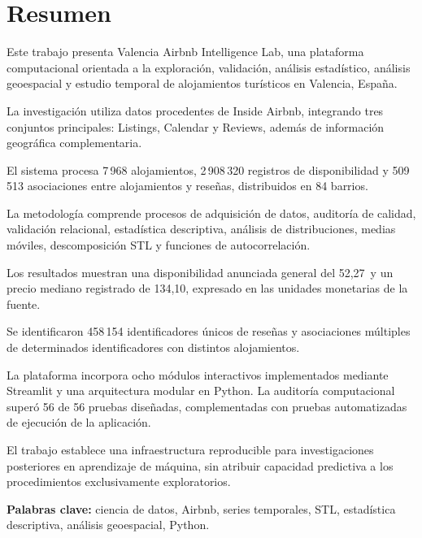 \documentclass[11pt,a4paper]{article}
\begin{document}

\begingroup
\small
\setlength{\parskip}{4pt}
\section*{Resumen}

Este trabajo presenta Valencia Airbnb Intelligence Lab,
una plataforma computacional orientada a la exploración,
validación, análisis estadístico, análisis geoespacial
y estudio temporal de alojamientos turísticos en
Valencia, España.

La investigación utiliza datos procedentes de Inside
Airbnb, integrando tres conjuntos principales:
Listings, Calendar y Reviews, además de información
geográfica complementaria.

El sistema procesa 7\,968 alojamientos, 2\,908\,320
registros de disponibilidad y 509\,513 asociaciones
entre alojamientos y reseñas, distribuidos en 84 barrios.

La metodología comprende procesos de adquisición de
datos, auditoría de calidad, validación relacional,
estadística descriptiva, análisis de distribuciones,
medias móviles, descomposición STL y funciones de
autocorrelación.

Los resultados muestran una disponibilidad anunciada
general del 52,27\, y un precio mediano registrado
de 134,10, expresado en las unidades monetarias de
la fuente.

Se identificaron 458\,154 identificadores únicos de
reseñas y asociaciones múltiples de determinados
identificadores con distintos alojamientos.

La plataforma incorpora ocho módulos interactivos
implementados mediante Streamlit y una arquitectura
modular en Python. La auditoría computacional superó
56 de 56 pruebas diseñadas, complementadas con
pruebas automatizadas de ejecución de la aplicación.

El trabajo establece una infraestructura reproducible
para investigaciones posteriores en aprendizaje de
máquina, sin atribuir capacidad predictiva a los
procedimientos exclusivamente exploratorios.

\textbf{Palabras clave:} ciencia de datos, Airbnb,
series temporales, STL, estadística descriptiva,
análisis geoespacial, Python.

\end{document}
